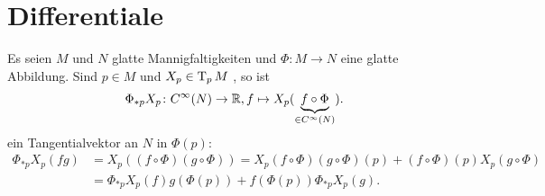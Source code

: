 
\chapter{Differentiale}
Es seien $M$ und $N$ glatte Mannigfaltigkeiten und $\Phi \colon M \to N$ eine glatte Abbildung.
Sind $p \in M$ und $X_p \in \operatorname{T}_pM$ , so ist 
\begin{align*}
	\Phi_{*p}X_p \colon C^{\infty}(N) \to \operatorname{\mathbb{R}}, f \mapsto X_p(\underbrace{f \circ \Phi}_{\in C^{\infty}(N)}).
\end{align*}
ein Tangentialvektor an $N$ in $\Phi(p)$:
\begin{align*}
	\Phi_{*p}X_p(fg) & = X_p((f \circ \Phi)(g \circ \Phi)) = X_p(f \circ \Phi)(g \circ \Phi)(p) + (f \circ \Phi)(p)X_p(g \circ \Phi)\\
	& = \Phi_{*p}X_p(f)g(\Phi(p)) + f(\Phi(p)) \Phi_{*p}X_p(g).
\end{align*}
